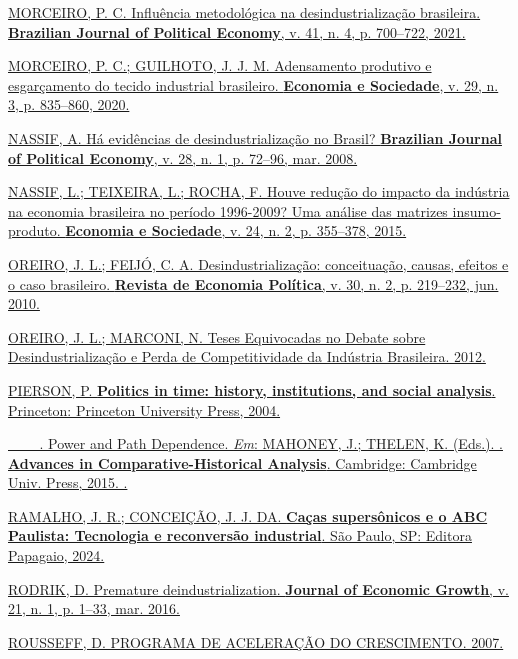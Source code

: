\href{https://www.zotero.org/google-docs/?p3HTgZ}{MORCEIRO, P. C.
Influência metodológica na desindustrialização brasileira.
\textbf{Brazilian Journal of Political Economy}, v. 41, n. 4, p.
700--722, 2021.}

\href{https://www.zotero.org/google-docs/?p3HTgZ}{MORCEIRO, P. C.;
GUILHOTO, J. J. M. Adensamento produtivo e esgarçamento do tecido
industrial brasileiro. \textbf{Economia e Sociedade}, v. 29, n. 3, p.
835--860, 2020.}

\href{https://www.zotero.org/google-docs/?p3HTgZ}{NASSIF, A. Há
evidências de desindustrialização no Brasil? \textbf{Brazilian Journal
of Political Economy}, v. 28, n. 1, p. 72--96, mar. 2008.}

\href{https://www.zotero.org/google-docs/?p3HTgZ}{NASSIF, L.; TEIXEIRA,
L.; ROCHA, F. Houve redução do impacto da indústria na economia
brasileira no período 1996-2009? Uma análise das matrizes
insumo-produto. \textbf{Economia e Sociedade}, v. 24, n. 2, p. 355--378,
2015.}

\href{https://www.zotero.org/google-docs/?p3HTgZ}{OREIRO, J. L.; FEIJÓ,
C. A. Desindustrialização: conceituação, causas, efeitos e o caso
brasileiro. \textbf{Revista de Economia Política}, v. 30, n. 2, p.
219--232, jun. 2010.}

\href{https://www.zotero.org/google-docs/?p3HTgZ}{OREIRO, J. L.;
MARCONI, N. Teses Equivocadas no Debate sobre Desindustrialização e
Perda de Competitividade da Indústria Brasileira. 2012.}

\href{https://www.zotero.org/google-docs/?p3HTgZ}{PIERSON, P.
\textbf{Politics in time: history, institutions, and social analysis}.
Princeton: Princeton University Press, 2004.}

\href{https://www.zotero.org/google-docs/?p3HTgZ}{\_\_\_. Power and Path
Dependence. \emph{Em}: MAHONEY, J.; THELEN, K. (Eds.). .
\textbf{Advances in Comparative-Historical Analysis}. Cambridge:
Cambridge Univ. Press, 2015. .}

\href{https://www.zotero.org/google-docs/?p3HTgZ}{RAMALHO, J. R.;
CONCEIÇÃO, J. J. DA. \textbf{Caças supersônicos e o ABC Paulista:
Tecnologia e reconversão industrial}. São Paulo, SP: Editora Papagaio,
2024.}

\href{https://www.zotero.org/google-docs/?p3HTgZ}{RODRIK, D. Premature
deindustrialization. \textbf{Journal of Economic Growth}, v. 21, n. 1,
p. 1--33, mar. 2016.}

\href{https://www.zotero.org/google-docs/?p3HTgZ}{ROUSSEFF, D. PROGRAMA
DE ACELERAÇÃO DO CRESCIMENTO. 2007.}

